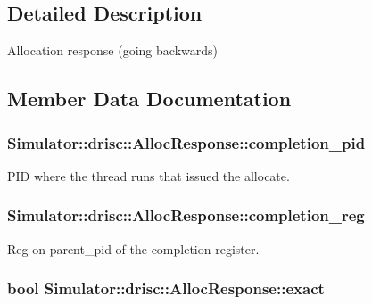 \subsection{Detailed Description}
Allocation response (going backwards) 

\subsection{Member Data Documentation}
\hypertarget{struct_simulator_1_1drisc_1_1_alloc_response_ac071b34bcd711f8819bba0d9d01a5cad}{
\subsubsection[{completion\+\_\+pid}]{ Simulator\+::drisc\+::\+Alloc\+Response\+::completion\+\_\+pid}}\label{struct_simulator_1_1drisc_1_1_alloc_response_ac071b34bcd711f8819bba0d9d01a5cad}


P\+I\+D where the thread runs that issued the allocate. 

\hypertarget{struct_simulator_1_1drisc_1_1_alloc_response_a93fbecda50acbeb731af9b81bbbc82bb}{
\subsubsection[{completion\+\_\+reg}]{ Simulator\+::drisc\+::\+Alloc\+Response\+::completion\+\_\+reg}}\label{struct_simulator_1_1drisc_1_1_alloc_response_a93fbecda50acbeb731af9b81bbbc82bb}


Reg on parent\+\_\+pid of the completion register. 

\hypertarget{struct_simulator_1_1drisc_1_1_alloc_response_a83d3c98ad20acd712266852db84b5918}{
\subsubsection[{exact}]{\setlength{\rightskip}{0pt plus 5cm}bool Simulator\+::drisc\+::\+Alloc\+Response\+::exact}}\label{struct_simulator_1_1drisc_1_1_alloc_response_a83d3c98ad20acd712266852db84b5918}


